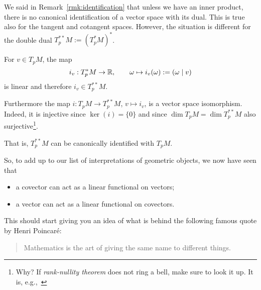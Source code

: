 \begin{remark}\label{rmk:double_dual}
  We said in Remark~\ref{rmk:identification} that unless we have an inner product, there is no canonical identification of a vector space with its dual.
  This is true also for the tangent and cotangent spaces.
  However, the situation is different for the double dual $T^{**}_pM := (T^*_pM)^*$.

  For $v\in T_p M$, the map
  \begin{equation}
    i_v: T_p^*M\to \mathbb{R}, \qquad
    \omega \mapsto i_v(\omega) := (\omega\mid v)
  \end{equation}
  is linear and therefore $i_v\in T^{**}_pM$.

  Furthermore the map $i : T_pM \to T_p^{**}M$, $v\mapsto i_v$, is a vector space isomorphism. Indeed, it is injective since $\ker(i) = \{0\}$ and since $\dim T_p M = \dim T^{**}_p M$ also surjective\footnote{Why? If \emph{rank-nullity theorem} does not ring a bell, make sure to look it up. It is, e.g.,~\cite[Corollary B.21]{book:lee}}.

  That is, $T^{**}_pM$ can be canonically identified with $T_p M$.

  So, to add up to our list of interpretations of geometric objects, we now have seen that
  \begin{itemize}
    \item a covector can act as a linear functional on vectors;
    \item a vector can act as a linear functional on covectors.
  \end{itemize}
\end{remark}

This should start giving you an idea of what is behind the following famous quote by Henri Poincar\'e:
\begin{quote}
  Mathematics is the art of giving the same name to different things.
\end{quote}


